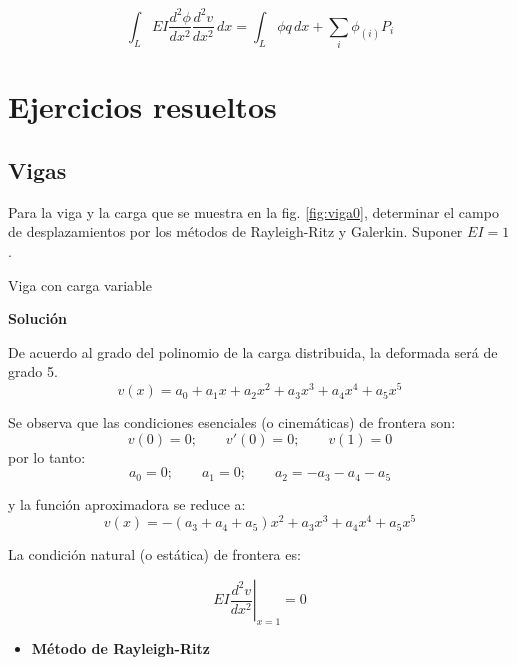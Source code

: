 \begin{equation}
	\int_L EI \frac{d^2\phi}{dx^2} \frac{d^2v}{dx^2} \, dx = \int_L \phi q \, dx + 
	\sum_i \phi_{(i)} P_i
	\label{eq:tv-vigas}
\end{equation}

\section{Ejercicios resueltos}

\subsection{Vigas}

\begin{example} \label{ex:viga0}
	
	Para la viga y la carga que se muestra en la fig. \ref{fig:viga0}, determinar el 
	campo de desplazamientos por los métodos de Rayleigh-Ritz y Galerkin. Suponer $EI = 1$.
	
\begin{marginfigure}[-.5cm]
	\centering
	
	\caption{Viga con carga variable}
	\label{fig:viga0}
\end{marginfigure}

\textbf{Solución}

De acuerdo al grado del polinomio de la carga distribuida, la deformada será de grado 5.
\[ v(x) = a_0 + a_1x + a_2 x^2 + a_3 x^3 + a_4 x^4 + a_5 x^5\]

Se observa que las condiciones esenciales (o cinemáticas) de frontera son:
\[ v(0) = 0; \qquad v'(0)=0; \qquad v(1) = 0 \]
por lo tanto:
\[ a_0 = 0; \qquad a_1 = 0; \qquad a_2 = -a_{3} - a_{4} - a_{5} \]

y la función aproximadora se reduce a:
\begin{equation}
	v(x) = - \left(a_{3} + a_{4} + a_{5}\right) x^{2} + a_{3} x^{3} + a_{4} x^{4} + a_{5} x^{5} 
	\label{eq:v0}
\end{equation}

La condición natural (o estática) de frontera es:

\begin{equation}
	\left. EI \frac{d^2v}{dx^2} \right|_{x=1} = 0
\end{equation}

\begin{itemize}
	\item \textbf{Método de Rayleigh-Ritz}
	

\end{itemize}
\end{example}
